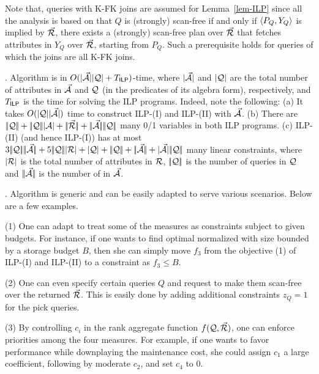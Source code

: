 {Note that, \SPC queries with K-FK joins are assumed for
Lemma~\ref{lem-ILP} since all the analysis is based on that $Q$ is
(strongly) scan-free if and only if $\langle P_{Q},\allowbreak Y_{Q}\rangle$ is
implied by $\vec{{\mathcal R}}$, \ie there exists a (strongly) scan-free
plan over $\vec{{\mathcal R}}$ that fetches attributes in $Y_{Q}$ over
$\vec{{\mathcal R}}$, starting from $P_{Q}$. Such a prerequisite holds for
\SPC queries of which the joins are all K-FK joins. 


. Algorithm \opts is in
$O(|{\vec{{\mathcal A}}}||{\mathcal Q}| + T_{\protect\mathsf{ILP}} )$-time, where
$|{\vec{{\mathcal A}}}|$ and $|{\mathcal Q}|$ are the total number of attributes
in $\vec{{\mathcal A}}$ and $\mathcal Q$ (in the predicates of its algebra form),
respectively, and $T_{\protect\mathsf{ILP}}$ is the time for solving the ILP programs. 
Indeed, note the following:
(a) It takes $O(|{\mathcal Q}||{\vec{{\mathcal A}}}|)$ time to construct ILP-(I) and
ILP-(II) with $\vec{{\mathcal A}}$.
(b) There are $\cdd{\Q} + \cdd{\Q}\cd{\A} + \cdd{\kb{\R}} + \cdd{\kb{\A}}\cdd{\Q}$ many 0/1
variables in both ILP programs.
(c) ILP-(II) (and hence ILP-(I)) has at most
$3\cdd{\Q}\cdd{\kb{\A}} + 5\cdd{\Q}\cd{\R} + \cd{\Q} +
\cdd{\Q} + \cdd{\kb{\A}} + \cd{\kb{\A}}\cdd{\Q}$ many linear
constraints, where $|{{\mathcal R}}|$ is the total number of attributes in
${\mathcal R}$, $|\!|{\mathcal Q}|\!|$ is the number of queries in $\mathcal Q$ and
$|\!|{\vec{{\mathcal A}}}|\!|$ is the number of \bss in $\vec{{\mathcal A}}$. 



. Algorithm \opts is generic and can be easily
adapted to serve various scenarios. Below are a few examples.

\sstab (1) One can adapt \opts to treat some of the measures
as constraints subject to given budgets. For instance, if one
wants to find optimal normalized \bds with size bounded by a
storage budget $B$, then she can simply move $f_{3}$ from the
objective (1) of ILP-(I) and ILP-(II) to a constraint as
$f_{3}\leq B$.

\sstab (2) One can even specify certain queries $Q$ and request
to make them scan-free over the returned \bds $\vec{{\mathcal R}}$. This is
easily done by adding additional constraints $z_{Q} = 1$
for the pick queries.

\sstab (3) By controlling $c_{i}$ in the rank aggregate function
$f(\mathcal Q, \vec{{\mathcal R}})$, one can enforce priorities among the four
measures. For example, if one wants to favor performance while
downplaying the maintenance cost, she could assign $c_{1}$ a
large coefficient, following by moderate $c_{2}$, and set $c_{4}$
to 0.
}%
